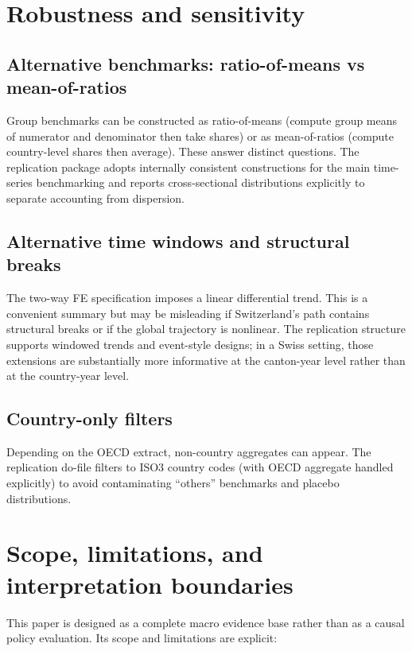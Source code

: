 \documentclass[11pt,a4paper]{article}
\newcommand{\OECD}{\textsc{OECD}}
\begin{document}
\section{Robustness and sensitivity}
\label{sec:robust}

\subsection{Alternative benchmarks: ratio-of-means vs mean-of-ratios}
Group benchmarks can be constructed as ratio-of-means (compute group means of numerator and denominator then take shares) or as mean-of-ratios (compute country-level shares then average). These answer distinct questions. The replication package adopts internally consistent constructions for the main time-series benchmarking and reports cross-sectional distributions explicitly to separate accounting from dispersion.

\subsection{Alternative time windows and structural breaks}
The two-way FE specification imposes a linear differential trend. This is a convenient summary but may be misleading if Switzerland's path contains structural breaks or if the global trajectory is nonlinear. The replication structure supports windowed trends and event-style designs; in a Swiss setting, those extensions are substantially more informative at the canton-year level rather than at the country-year level.

\subsection{Country-only filters}
Depending on the OECD extract, non-country aggregates can appear. The replication do-file filters to ISO3 country codes (with \OECD{} aggregate handled explicitly) to avoid contaminating ``others'' benchmarks and placebo distributions.

\section{Scope, limitations, and interpretation boundaries}
\label{sec:limits}

This paper is designed as a complete macro evidence base rather than as a causal policy evaluation. Its scope and limitations are explicit:
\end{document}

